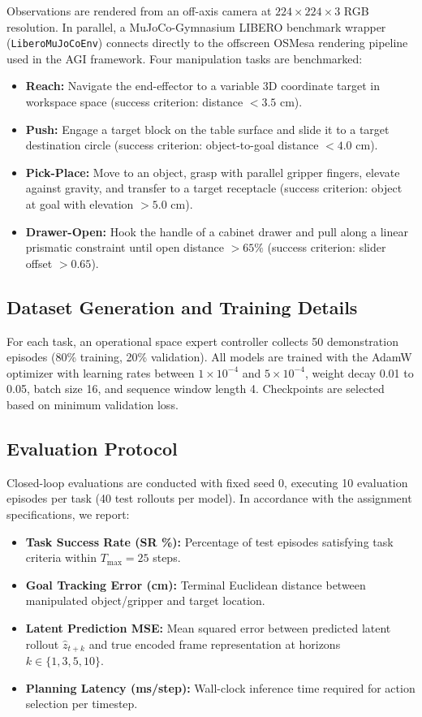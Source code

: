 \documentclass[10pt,journal,compsoc]{IEEEtran}
\begin{document}
Observations are rendered from an off-axis camera at $224 \times 224 \times 3$ RGB resolution. In parallel, a MuJoCo-Gymnasium LIBERO benchmark wrapper (\texttt{LiberoMuJoCoEnv}) connects directly to the offscreen OSMesa rendering pipeline used in the AGI framework. Four manipulation tasks are benchmarked:
\begin{itemize}
    \item \textbf{Reach:} Navigate the end-effector to a variable 3D coordinate target in workspace space (success criterion: distance $< 3.5$ cm).
    \item \textbf{Push:} Engage a target block on the table surface and slide it to a target destination circle (success criterion: object-to-goal distance $< 4.0$ cm).
    \item \textbf{Pick-Place:} Move to an object, grasp with parallel gripper fingers, elevate against gravity, and transfer to a target receptacle (success criterion: object at goal with elevation $> 5.0$ cm).
    \item \textbf{Drawer-Open:} Hook the handle of a cabinet drawer and pull along a linear prismatic constraint until open distance $> 65\%$ (success criterion: slider offset $> 0.65$).
\end{itemize}

\subsection{Dataset Generation and Training Details}

For each task, an operational space expert controller collects 50 demonstration episodes (80\% training, 20\% validation). All models are trained with the AdamW optimizer with learning rates between $1 \times 10^{-4}$ and $5 \times 10^{-4}$, weight decay 0.01 to 0.05, batch size 16, and sequence window length 4. Checkpoints are selected based on minimum validation loss.

\subsection{Evaluation Protocol}

Closed-loop evaluations are conducted with fixed seed 0, executing 10 evaluation episodes per task (40 test rollouts per model). In accordance with the assignment specifications, we report:
\begin{itemize}
    \item \textbf{Task Success Rate (SR \%):} Percentage of test episodes satisfying task criteria within $T_{\max} = 25$ steps.
    \item \textbf{Goal Tracking Error (cm):} Terminal Euclidean distance between manipulated object/gripper and target location.
    \item \textbf{Latent Prediction MSE:} Mean squared error between predicted latent rollout $\hat{z}_{t+k}$ and true encoded frame representation at horizons $k \in \{1, 3, 5, 10\}$.
    \item \textbf{Planning Latency (ms/step):} Wall-clock inference time required for action selection per timestep.
\end{itemize}
\end{document}
